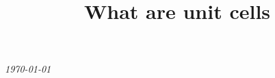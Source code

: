 \documentclass[preprint]{iucr}              %
\numberwithin{equation}{section}
\begin{document}
	
	
	
	
	
	
	
	
	
	
	
	{\LARGE \emph{\today}} \\
	\title{What are unit cells}
	
	
\end{document}
